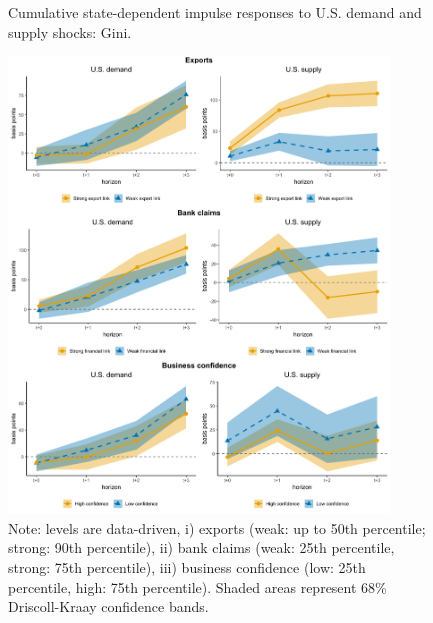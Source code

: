 \documentclass[12pt, a4paper]{article}
\begin{document}
\begin{figure}[H]
    \centering
    \caption{Cumulative state-dependent impulse responses to U.S. demand and supply shocks: Gini.}
    \label{fig:demand_supply_channels_ag}
    \includegraphics[width=0.90\textwidth]{Figures/state_dependent_IRFs}
    \centering \caption*{Note: levels are data-driven, i) exports (weak: up to 50th percentile; strong: 90th percentile), ii) bank claims (weak: 25th percentile, strong: 75th percentile), iii) business confidence (low: 25th percentile, high: 75th percentile). Shaded areas represent 68\% Driscoll-Kraay confidence bands.}
\end{figure}
\end{document}
